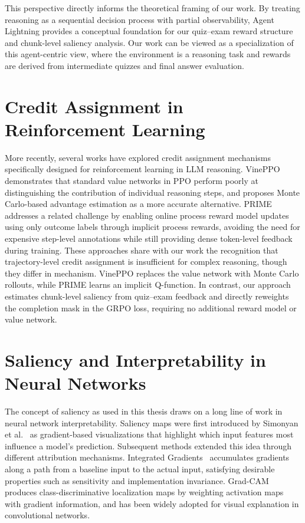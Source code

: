 \documentclass[12pt]{report}
\begin{document}
This perspective directly informs the theoretical framing of our work. By treating reasoning as a sequential decision process with partial observability, Agent Lightning provides a conceptual foundation for our quiz–exam reward structure and chunk-level saliency analysis. Our work can be viewed as a specialization of this agent-centric view, where the environment is a reasoning task and rewards are derived from intermediate quizzes and final answer evaluation. 

\section{Credit Assignment in Reinforcement Learning}
More recently, several works have explored credit assignment mechanisms specifically designed for reinforcement learning in LLM reasoning. VinePPO~\cite{kazemnejad2025vinepporefiningcreditassignment} demonstrates that standard value networks in PPO perform poorly at distinguishing the contribution of individual reasoning steps, and proposes Monte Carlo-based advantage estimation as a more accurate alternative. PRIME~\cite{cui2025processreinforcementimplicitrewards} addresses a related challenge by enabling online process reward model updates using only outcome labels through implicit process rewards, avoiding the need for expensive step-level annotations while still providing dense token-level feedback during training. These approaches share with our work the recognition that trajectory-level credit assignment is insufficient for complex reasoning, though they differ in mechanism. VinePPO replaces the value network with Monte Carlo rollouts, while PRIME learns an implicit Q-function. In contrast, our approach estimates chunk-level saliency from quiz–exam feedback and directly reweights the completion mask in the GRPO loss, requiring no additional reward model or value network.

\section{Saliency and Interpretability in Neural Networks}

The concept of saliency as used in this thesis draws on a long line of work in neural network interpretability. Saliency maps were first introduced by Simonyan et al.~\cite{simonyan2014deepinsideconvolutionalnetworks} as gradient-based visualizations that highlight which input features most influence a model's prediction. Subsequent methods extended this idea through different attribution mechanisms. Integrated Gradients~\cite{sundararajan2017axiomaticattributiondeepnetworks} accumulates gradients along a path from a baseline input to the actual input, satisfying desirable properties such as sensitivity and implementation invariance. Grad-CAM~\cite{Selvaraju_2019} produces class-discriminative localization maps by weighting activation maps with gradient information, and has been widely adopted for visual explanation in convolutional networks.
\end{document}
